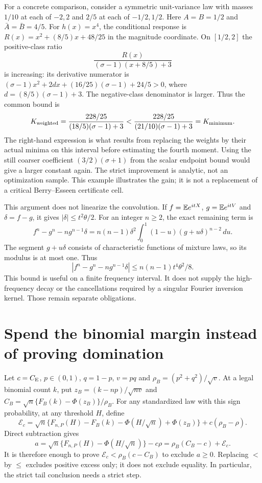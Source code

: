 For a concrete comparison, consider a symmetric unit-variance law with
masses $1/10$ at each of $-2,2$ and $2/5$ at each of $-1/2,1/2$.
Here $A=B=1/2$ and $\bar A=\bar B=4/5$.
For $h(x)=x^4$, the conditional response is
$R(x)=x^2+(8/5)x+48/25$ in the magnitude coordinate.
On $[1/2,2]$ the positive-class ratio
\[
 \frac{R(x)}{(\sigma-1)(x+8/5)+3}
\]
is increasing: its derivative numerator is
$(\sigma-1)x^2+2d x+(16/25)(\sigma-1)+24/5>0$,
where $d=(8/5)(\sigma-1)+3$.
The negative-class denominator is larger. Thus the common bound is
\[
 K_{\rm weighted}=\frac{228/25}{(18/5)(\sigma-1)+3}
 <\frac{228/25}{(21/10)(\sigma-1)+3}=K_{\rm minimum}.
\]
The right-hand expression is what results from replacing the weights
by their actual minima on this interval before estimating the fourth moment.
Using the still coarser coefficient $(3/2)(\sigma+1)$ from the scalar
endpoint bound would give a larger constant again.
The strict improvement is analytic, not an optimization sample. This
example illustrates the gain; it is not a replacement of a critical
Berry--Esseen certificate cell.

This argument does not linearize the convolution. If $f=\mathbb E e^{itX}$,
$g=\mathbb E e^{itV}$ and $\delta=f-g$, it gives $|\delta|\le t^2\theta/2$.
For an integer $n\ge2$, the exact remaining term is
\[
 f^n-g^n-ng^{n-1}\delta
 =n(n-1)\delta^2\int_0^1(1-u)(g+u\delta)^{n-2}\,du.
\]
The segment $g+u\delta$ consists of characteristic functions of mixture
laws, so its modulus is at most one. Thus
\[
 |f^n-g^n-ng^{n-1}\delta|\le n(n-1)t^4\theta^2/8.
\]
This bound is useful on a finite frequency interval. It does not supply
the high-frequency decay or the cancellations required by a singular
Fourier inversion kernel. Those remain separate obligations.

\section{Spend the binomial margin instead of proving domination}

Let $c=C_{\mathrm E}$, $p\in(0,1)$, $q=1-p$, $v=pq$ and
$\rho_B=(p^2+q^2)/\sqrt v$. At a legal binomial count $k$, put
$z_B=(k-np)/\sqrt{nv}$ and
$C_B=\sqrt n\{F_B(k)-\Phi(z_B)\}/\rho_B$.
For any standardized law with this sign probability, at any threshold $H$,
define
\[
 \mathcal E_c=\sqrt n\{F_{n,P}(H)-F_B(k)-\Phi(H/\sqrt n)+\Phi(z_B)\}
                    +c(\rho_B-\rho).
\]
Direct subtraction gives
\[
 a=\sqrt n\{F_{n,P}(H)-\Phi(H/\sqrt n)\}-c\rho
      =\rho_B(C_B-c)+\mathcal E_c.
\]
It is therefore enough to prove
$\mathcal E_c<\rho_B(c-C_B)$ to exclude $a\ge0$.
Replacing $<$ by $\le$ excludes positive excess only; it does not exclude
equality. In particular, the strict tail conclusion needs a strict step.

